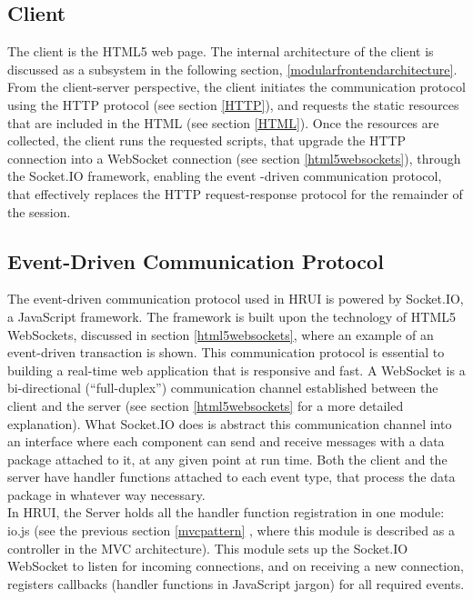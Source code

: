 \subsection{Client}
The client is the HTML5 web page. The internal architecture of the client is discussed as a subsystem in the following 
section, \ref{modularfrontendarchitecture}. From the client-server perspective, the client initiates the communication 
protocol using the HTTP protocol (see section \ref{HTTP}), and requests the static resources that are included in the HTML 
(see section \ref{HTML}). Once the resources are collected, the client runs the requested scripts, that upgrade the HTTP 
connection into a WebSocket connection (see section \ref{html5websockets}), through the Socket.IO framework, enabling the event
-driven communication protocol, that effectively replaces the HTTP request-response protocol for the remainder of the session.
\subsection{Event-Driven Communication Protocol} \label{eventdrivencommunicationprotocol}
The event-driven communication protocol used in HRUI is powered by Socket.IO, a JavaScript framework. The framework is built 
upon the technology of HTML5 WebSockets, discussed in section \ref{html5websockets}, where an example of an event-driven 
transaction is shown. This communication protocol is essential to building a real-time web application that is responsive and 
fast. A WebSocket is a bi-directional (``full-duplex'') communication channel established between the client and the server 
(see section \ref{html5websockets} for a more detailed explanation). What Socket.IO does is abstract this communication 
channel into an interface where each component can send and receive messages with a data package attached to it, at any given 
point at run time. Both the client and the server have handler functions attached to each event type, that process the data 
package in whatever way necessary.\\

In HRUI, the Server holds all the handler function registration in one module: io.js (see the previous section \ref{mvcpattern}
, where this module is described as a controller in the MVC architecture). This module sets up the Socket.IO WebSocket to 
listen for incoming connections, and on receiving a new connection, registers callbacks (handler functions in JavaScript 
jargon) for all required events.\\

